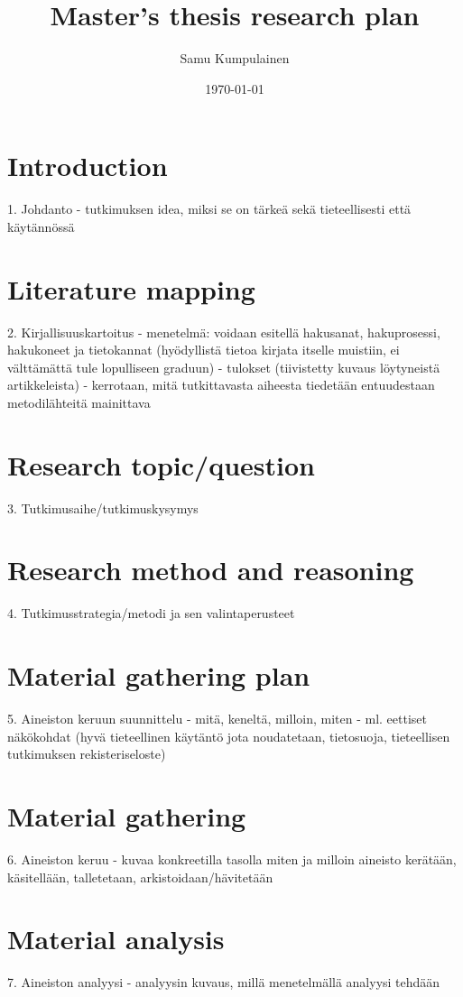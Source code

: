 \documentclass[12pt]{article}
\begin{document}
\title{Master's thesis research plan}
\author{Samu Kumpulainen}
\date{\today}
\maketitle

\newpage

\section{Introduction}
1. Johdanto
- tutkimuksen idea, miksi se on tärkeä sekä tieteellisesti että käytännössä

\section{Literature mapping}
2. Kirjallisuuskartoitus 
- menetelmä: voidaan esitellä hakusanat, hakuprosessi, hakukoneet ja tietokannat (hyödyllistä tietoa kirjata itselle muistiin, ei välttämättä tule lopulliseen graduun)
- tulokset (tiivistetty kuvaus löytyneistä artikkeleista)
- kerrotaan, mitä tutkittavasta aiheesta tiedetään entuudestaan
metodilähteitä mainittava

\section{Research topic/question}
3. Tutkimusaihe/tutkimuskysymys

\section{Research method and reasoning}
4. Tutkimusstrategia/metodi ja sen valintaperusteet

\section{Material gathering plan}
5. Aineiston keruun suunnittelu
- mitä, keneltä, milloin, miten
- ml. eettiset näkökohdat (hyvä tieteellinen käytäntö jota noudatetaan, tietosuoja, tieteellisen tutkimuksen rekisteriseloste)

\section{Material gathering}
6. Aineiston keruu 
- kuvaa konkreetilla tasolla miten ja milloin aineisto kerätään, käsitellään, talletetaan, arkistoidaan/hävitetään

\section{Material analysis}
7. Aineiston analyysi 
- analyysin kuvaus, millä menetelmällä analyysi tehdään
\end{document}
